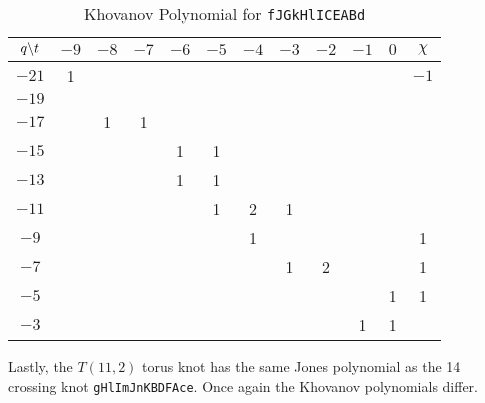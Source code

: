     \begin{table}
        \centering
        \begin{tabular}{| c | c | c | c | c | c | c | c | c | c | c | c |}
            \hline
            $q\symbol{92}t$&$-9$&$-8$&$-7$&$-6$&$-5$&$-4$&$-3$&$-2$&$-1$&$0$&$\chi$\\
            \hline
            $-21$&1&&&&&&&&&&$-1$\\
            \hline
            $-19$&&&&&&&&&&&\\
            \hline
            $-17$&&1&1&&&&&&&&\\
            \hline
            $-15$&&&&1&1&&&&&&\\
            \hline
            $-13$&&&&1&1&&&&&&\\
            \hline
            $-11$&&&&&1&2&1&&&&\\
            \hline
            $-9$&&&&&&1&&&&&1\\
            \hline
            $-7$&&&&&&&1&2&&&1\\
            \hline
            $-5$&&&&&&&&&&1&1\\
            \hline
            $-3$&&&&&&&&&1&1&\\
            \hline
        \end{tabular}
        \caption{Khovanov Polynomial for \texttt{fJGkHlICEABd}}
        \label{table:fJGkHlICEABd_kho}
    \end{table}
    Lastly, the $T(11,2)$ torus knot has the same Jones polynomial as the
    14 crossing knot \texttt{gHlImJnKBDFAce}. Once again the Khovanov
    polynomials differ.
